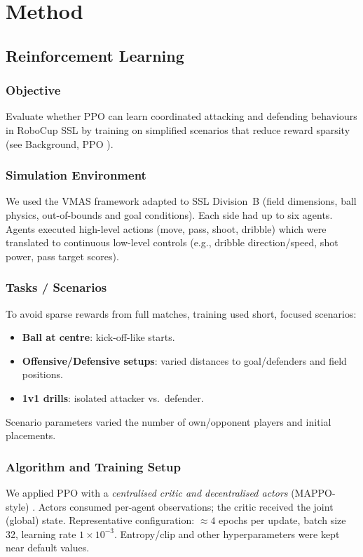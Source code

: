 \section{Method}
\subsection{Reinforcement Learning}
\label{subsec:rl-method}

\subsubsection{Objective}
Evaluate whether PPO can learn coordinated attacking and defending behaviours in RoboCup SSL by training on simplified scenarios that reduce reward sparsity (see Background, PPO \cite{Schulman2017PPO,Yu2021MAPPO}).

\subsubsection{Simulation Environment}
We used the VMAS framework adapted to SSL Division~B (field dimensions, ball physics, out-of-bounds and goal conditions). Each side had up to six agents. Agents executed high-level actions (move, pass, shoot, dribble) which were translated to continuous low-level controls (e.g., dribble direction/speed, shot power, pass target scores).

\subsubsection{Tasks / Scenarios}
To avoid sparse rewards from full matches, training used short, focused scenarios:
\begin{itemize}
  \item \textbf{Ball at centre}: kick-off-like starts.
  \item \textbf{Offensive/Defensive setups}: varied distances to goal/defenders and field positions.
  \item \textbf{1v1 drills}: isolated attacker vs.\ defender.
\end{itemize}
Scenario parameters varied the number of own/opponent players and initial placements.

\subsubsection{Algorithm and Training Setup}
We applied PPO with a \textit{centralised critic and decentralised actors} (MAPPO-style) \cite{Yu2021MAPPO}. Actors consumed per-agent observations; the critic received the joint (global) state. Representative configuration: \(\approx 4\) epochs per update, batch size 32, learning rate \(1\times10^{-3}\). Entropy/clip and other hyperparameters were kept near default values.

